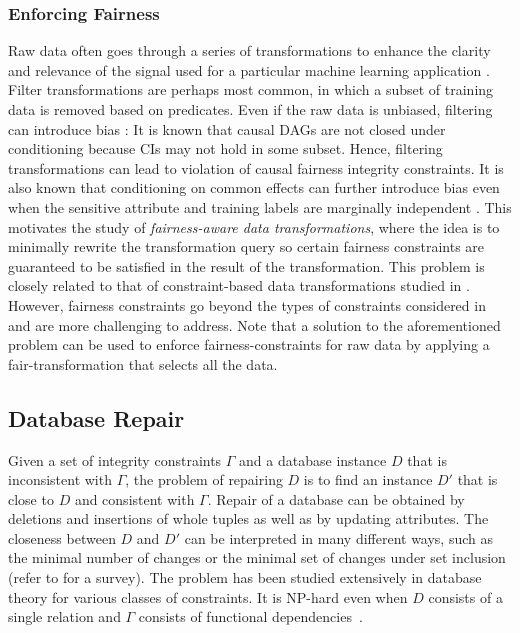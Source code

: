 \documentclass[11pt]{article}
\begin{document}
\subsubsection{Enforcing Fairness}
\label{sec:queryrep}

Raw data often goes through a series of transformations to enhance the clarity and relevance of the signal used for a particular machine learning application \cite{antenucci2018constraint}.  Filter transformations are perhaps most common, in which a subset of training data is removed based on predicates. Even if the raw data is unbiased, filtering can introduce bias \cite{antenucci2018constraint,salimi2018bias}: It is known that causal DAGs are not closed under conditioning because CIs may not hold in some subset. Hence, filtering transformations can lead to violation of causal fairness integrity constraints. It is also known that conditioning on common effects can further introduce bias even when the sensitive attribute and training labels are marginally independent \cite{pearl2003causality}.  This motivates the study of {\em fairness-aware data transformations}, where the idea is to minimally rewrite the transformation query so certain fairness constraints are guaranteed to be satisfied in the result of the transformation. This problem is closely related to that of constraint-based data transformations studied in \cite{antenucci2018constraint}. However, fairness constraints go beyond the types of constraints considered in \cite{antenucci2018constraint} and are more challenging to address. Note that a solution to the aforementioned problem can be used to enforce fairness-constraints for raw data by applying a fair-transformation that selects all the data. 



\vspace{-0.3cm}
\subsection{Database Repair}
\label{sec:dbrepair}

Given a set of integrity constraints $\Gamma$ and a database instance $D$ that is inconsistent with $\Gamma$, the problem of repairing $D$ is to find an instance $D'$ that is close to $D$ and consistent with $\Gamma$. Repair of a database can be obtained by deletions
and insertions of whole tuples as well as by updating attributes. The closeness between $D$ and $D'$ can be interpreted in many
different ways, such as the minimal number of changes or the minimal set of changes under set inclusion (refer to \cite{DBLP:series/synthesis/2011Bertossi} for a survey). The problem has been studied extensively in database theory for
various classes of constraints.  It is NP-hard even
when $D$ consists of a single relation
and $\Gamma$ consists of functional
dependencies~\cite{DBLP:conf/pods/LivshitsKR18}.  
\end{document}
